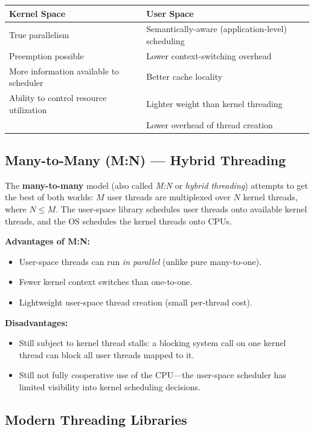 \documentclass[11pt]{article}
\begin{document}
\begin{center}
\begin{tabular}{ll}
\toprule
\textbf{Kernel Space} & \textbf{User Space} \\
\midrule
True parallelism & Semantically-aware (application-level) scheduling \\
Preemption possible & Lower context-switching overhead \\
More information available to scheduler & Better cache locality \\
Ability to control resource utilization & Lighter weight than kernel threading \\
 & Lower overhead of thread creation \\
\bottomrule
\end{tabular}
\end{center}

\subsection{Many-to-Many (M:N) --- Hybrid Threading}

The \textbf{many-to-many} model (also called \emph{M:N} or \emph{hybrid threading}) attempts to get the best of both worlds: $M$ user threads are multiplexed over $N$ kernel threads, where $N \leq M$. The user-space library schedules user threads onto available kernel threads, and the OS schedules the kernel threads onto CPUs.

\textbf{Advantages of M:N:}
\begin{itemize}
    \item User-space threads can run \emph{in parallel} (unlike pure many-to-one).
    \item Fewer kernel context switches than one-to-one.
    \item Lightweight user-space thread creation (small per-thread cost).
\end{itemize}

\textbf{Disadvantages:}
\begin{itemize}
    \item Still subject to kernel thread stalls: a blocking system call on one kernel thread can block all user threads mapped to it.
    \item Still not fully cooperative use of the CPU---the user-space scheduler has limited visibility into kernel scheduling decisions.
\end{itemize}

\subsection{Modern Threading Libraries}
\end{document}
